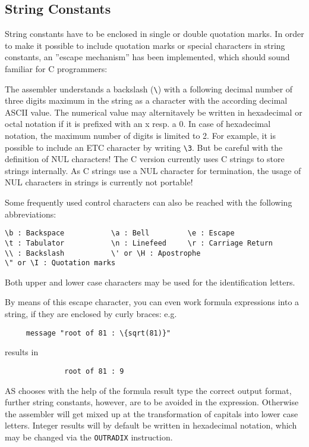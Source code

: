 \documentclass[12pt,twoside]{report}
\newcommand{\tty}[1]{{\tt #1}}
\begin{document}
\subsection{String Constants}
\label{SectStringConsts}

String constants have to be enclosed in single or double quotation marks.
In order to make it possible to include quotation marks or special characters
in string constants, an ''escape mechanism'' has been implemented, which
should sound familiar for C programmers:

The assembler understands a backslash (\verb!\!) with a following decimal
number of three digits maximum in the string as a character with the
according decimal ASCII value.  The numerical value may alternitavely be
written in hexadecimal or octal notation if it is prefixed with an x resp.
a 0.  In case of hexadecimal notation, the maximum number of digits is
limited to 2.  For example, it is possible to include an ETC character by
writing {\tt\verb!\!3}.  But be careful with the definition of NUL
characters!  The C  version currently uses C strings
to store strings internally.  As C strings use a NUL character for
termination, the usage of NUL characters in strings is currently not
portable!

Some frequently used control characters can also be reached with the
following abbreviations:
\begin{verbatim}
\b : Backspace           \a : Bell         \e : Escape
\t : Tabulator           \n : Linefeed     \r : Carriage Return
\\ : Backslash           \' or \H : Apostrophe
\" or \I : Quotation marks
\end{verbatim}
Both upper and lower case characters may be used for the
identification letters.

By means of this escape character, you can even work formula
expressions into a string, if they are enclosed by curly braces: e.g.
\begin{verbatim}
     message "root of 81 : \{sqrt(81)}"
\end{verbatim}
results in
\begin{verbatim}
              root of 81 : 9
\end{verbatim}
AS chooses with the help of the formula result type the correct
output format, further string constants, however, are to be avoided
in the expression.  Otherwise the assembler will get mixed up at the
transformation of capitals into lower case letters.  Integer results will
by default be written in hexadecimal notation, which may be changed via
the \tty{OUTRADIX} instruction.
\end{document}

